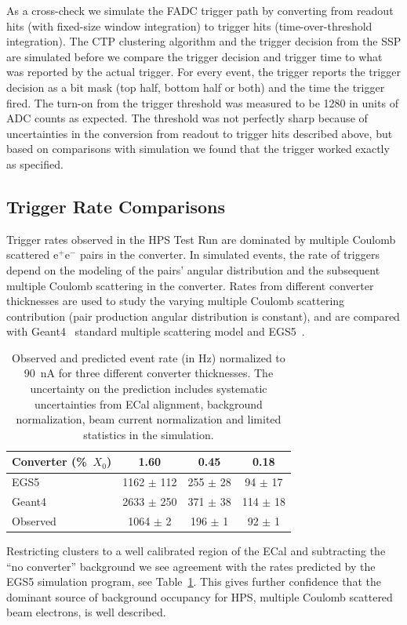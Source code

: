 \documentclass[final,3p,times,twocolumn]{elsarticle}
\newcommand{\ee}{e$^+$e$^-$}
\newcommand{\egs}{{\sc EGS5}}
\begin{document}
As a cross-check we simulate the FADC trigger path by converting from readout hits (with fixed-size 
window integration) to trigger hits (time-over-threshold integration). The CTP clustering 
algorithm and the trigger decision from the SSP are simulated before we compare the trigger decision 
and trigger time to what was reported by the actual trigger. For every event, the trigger reports the 
trigger decision as a bit mask (top half, bottom half or both) and the time the trigger fired.
The turn-on from the trigger threshold was measured to be 1280 in units of ADC counts as expected. 
The threshold was not perfectly sharp because of uncertainties in the conversion from readout to trigger 
hits described above, but based on comparisons with simulation we found that the 
trigger worked exactly as specified.


\subsection{Trigger Rate Comparisons}
Trigger rates observed in the HPS Test Run are dominated by multiple Coulomb scattered \ee{} pairs in the 
converter. In simulated events, the rate of triggers depend on the modeling of the pairs' angular 
distribution and the subsequent multiple Coulomb scattering in the converter. Rates from different 
converter 
thicknesses are used to study the varying multiple Coulomb scattering contribution (pair production 
angular distribution is constant), and are compared with Geant4~\cite{Agostinelli2003250} standard multiple 
scattering model and EGS5~\cite{egs5}. 
\begin{table}
{\small
\begin{tabular}{|l|c|c|c|}
\hline
\bf Converter (\%~$X_0$) & \bf 1.60 & \bf 0.45 &	\bf 0.18 \\
\hline
EGS5 &	1162 $\pm$ 112 &	255 $\pm$ 28 &	94 $\pm$ 17	\\
\hline
Geant4 & 2633 $\pm$ 250 & 	371 $\pm$ 38 &	114 $\pm$ 18 \\
\hline
Observed 	& 1064 $\pm$ 2 & 196 $\pm$ 1 &	92 $\pm$ 1 \\						
\hline
\end{tabular}
\caption{ Observed and predicted event rate (in Hz) normalized to 90~nA for three different converter 
thicknesses. The uncertainty on the prediction includes systematic uncertainties from ECal alignment, background normalization, beam current normalization and limited statistics in the simulation.
\label{results}}
}
\end{table}
Restricting clusters to a well calibrated region of the ECal and subtracting the ``no converter'' 
background we see agreement with the rates predicted by the \egs{} simulation 
program, 
see Table~\ref{results}.
This gives further confidence that the dominant source of background occupancy for HPS, multiple 
Coulomb scattered beam electrons, is well 
described.
\end{document}
